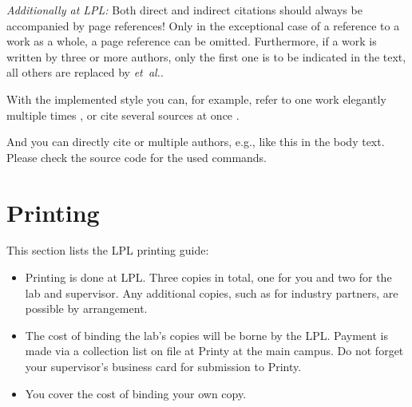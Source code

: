 \emph{Additionally at LPL:} Both direct and indirect citations should always be accompanied by page references! Only in the exceptional case of a reference to a work as a whole, a page reference can be omitted. Furthermore, if a work is written by three or more authors, only the first one is to be indicated in the text, all others are replaced by \emph{et\ al.}.

With the implemented style you can, for example, refer to one work \autocite[2\psq]{zimmermann2013vehicle} elegantly multiple times \autocite[17]{zimmermann2013vehicle}, or cite several sources at once \autocites[42--69]{zimmermann2013computing}[15\psqq]{zimmermann2017design}.

And you can directly cite \textcite{zimmermann2013vehicle} or multiple authors, e.g., \textcites{zimmermann2017design}{Schlosser2014} like this in the body text. Please check the source code for the used commands. 


\section{Printing}
This section lists the LPL printing guide:

\begin{itemize}
	\item Printing is done at LPL. Three copies in total, one for you and two for the lab and supervisor. Any additional copies, such as for industry partners, are possible by arrangement. 
	\item The cost of binding the lab's copies will be borne by the LPL. Payment is made via a collection list on file at Printy at the main campus. Do not forget your supervisor's business card for submission to Printy.
	\item You cover the cost of binding your own copy.
\end{itemize}

\cleardoubleemptypage